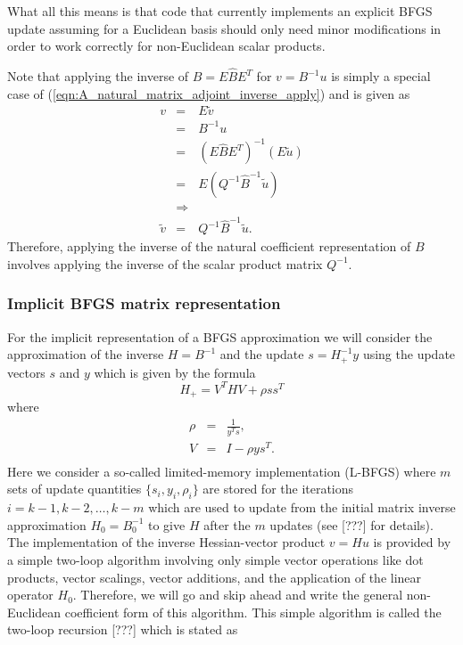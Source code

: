 \documentclass[pdf,ps2pdf,11pt]{SANDreport}
\begin{document}
What all this means is that code that currently implements an explicit BFGS
update assuming for a Euclidean basis should only need minor modifications in
order to work correctly for non-Euclidean scalar products.

Note that applying the inverse of $B = E {}\hat{B} E^T$ for $v = B^{-1} u$
is simply a special case of (\ref{eqn:A_natural_matrix_adjoint_inverse_apply})
and is given as
%
\begin{eqnarray}
v
& = & E \tilde{v} \nonumber \\
& = & B^{-1} u \nonumber \\
& = & (E \hat{B} E^T)^{-1} (E \tilde{u}) \nonumber \\
& = & E ( Q^{-1} \hat{B}^{-1} \tilde{u}) \nonumber \\
& \Rightarrow &  \nonumber \\
\tilde{v} & = & Q^{-1} \hat{B}^{-1} \tilde{u}.
\label{eqn:B_inverse}
\end{eqnarray}
%
Therefore, applying the inverse of the natural coefficient representation of
$B$ involves applying the inverse of the scalar product matrix $Q^{-1}$.

\subsubsection{Implicit BFGS matrix representation}

For the implicit representation of a BFGS approximation we will consider the
approximation of the inverse $H = B^{-1}$ and the update $s = H_+^{-1} y$
using the update vectors $s$ and $y$ which is given by the formula
%
\begin{equation}
H_+ = V^T H V + \rho s s^T
\end{equation}
%
where
\begin{eqnarray}
\rho & = & \frac{1}{y^T s}, \\
V & = & I - \rho y s^T. \\
\end{eqnarray}
Here we consider a so-called limited-memory implementation (L-BFGS) where $m$
sets of update quantities $\{s_i,y_i,\rho_i\}$ are stored for the iterations
$i = k-1, k-2, {}\ldots, k-m$ which are used to update from the initial matrix
inverse approximation $H_0 = B_0^{-1}$ to give $H$ after the $m$ updates (see
[???] for details).  The implementation of the inverse Hessian-vector product
$v = H u$ is provided by a simple two-loop algorithm involving only simple
vector operations like dot products, vector scalings, vector additions, and
the application of the linear operator $H_0$.  Therefore, we will go and skip
ahead and write the general non-Euclidean coefficient form of this algorithm.
This simple algorithm is called the two-loop recursion [???] which is stated
as
\end{document}
